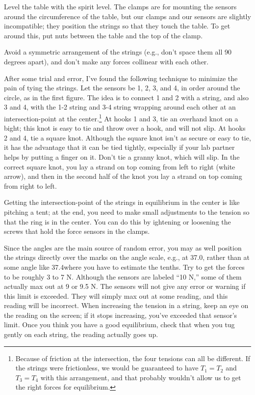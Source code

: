 Level the table with the spirit level. The clamps are for mounting the sensors around
the circumference of the table, but our clamps and our sensors are slightly incompatible;
they position the strings so that they touch the table. To get around this, put
nuts between the table and the top of the clamp.

Avoid a symmetric arrangement of
the strings (e.g., don't space them all 90 degrees apart), and
don't make any forces collinear with each other. 

After some trial and error, I've found the following technique to minimize the
pain of tying the strings. Let the sensors be 1, 2, 3, and 4, in order around the
circle, as in the first figure. The idea is to connect 1 and 2 with a string, and also
3 and 4, with the 1-2 string and 3-4 string wrapping around each other at an intersection-point at the 
center.\footnote{Because of friction at the intersection, the four tensions can all be different.
If the strings
were frictionless, we would be guaranteed to have $T_1=T_2$ and $T_3=T_4$ with this arrangement, and
that probably wouldn't allow us to get the right forces for equilibrium.}
At hooks 1 and 3, tie an overhand knot on a bight; this knot is easy
to tie and throw over a hook, and will not slip. At hooks 2 and 4, tie a square knot. Although the
square knot isn't as secure or easy to tie, it has the advantage that it can be tied tightly,
especially if your lab partner helps by putting a finger on it. Don't tie a granny knot, which will slip.
In the correct square knot, you lay a strand on top coming from left to right (white arrow), and then
in the second half of the knot you lay a strand on top coming from right to left.



Getting the intersection-point of the strings
in equilibrium in the center is like pitching a tent; at the end, you need
to make small adjustments to the tension so that the ring is in the center.
You can do this by
ightening or loosening the screws that hold the force sensors in the clamps.

Since the angles are the main source
of random error, you may as well position the strings directly over the marks on the angle scale,
e.g., at 37.0\degunit, rather than at some angle like 37.4\degunit where you have to estimate the tenths.
Try to get the forces to be roughly 3 to 7 N.
Although the sensors are labeled ``10 N,'' some of them actually max out at 9 or 9.5 N.
The sensors will not give any
error or warning if this limit is exceeded. They will simply max out at some
reading, and this reading will be incorrect. When increasing the tension in a string, keep an eye
on the reading on the screen; if it stops increasing, you've exceeded that sensor's limit.
Once you think you have a good equilibrium, check that when you tug gently on each string, the
reading actually goes up.

